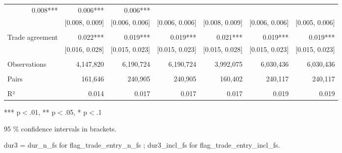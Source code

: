 \begin{table}[!h]
\begin{tabular}{lllllll}
  \multicolumn{1}{r}{0.008***} &
  \multicolumn{1}{r}{0.006***} &
  \multicolumn{1}{r}{0.006***} \\
\multicolumn{1}{l}{} &
  \multicolumn{1}{|r}{[0.008,   0.009]} &
  \multicolumn{1}{r}{[0.006,   0.006]} &
  \multicolumn{1}{r}{[0.006,   0.006]} &
  \multicolumn{1}{r}{[0.008,   0.009]} &
  \multicolumn{1}{r}{[0.006,   0.006]} &
  \multicolumn{1}{r}{[0.005,   0.006]} \\
\multicolumn{1}{l}{} &
  \multicolumn{1}{|r}{} &
  \multicolumn{1}{r}{} &
  \multicolumn{1}{r}{} &
  \multicolumn{1}{r}{} &
  \multicolumn{1}{r}{} &
  \multicolumn{1}{r}{} \\
\multicolumn{1}{l}{Trade agreement} &
  \multicolumn{1}{|r}{0.022***} &
  \multicolumn{1}{r}{0.019***} &
  \multicolumn{1}{r}{0.019***} &
  \multicolumn{1}{r}{0.021***} &
  \multicolumn{1}{r}{0.019***} &
  \multicolumn{1}{r}{0.019***} \\
\multicolumn{1}{l}{} &
  \multicolumn{1}{|r}{[0.016,   0.028]} &
  \multicolumn{1}{r}{[0.015,   0.023]} &
  \multicolumn{1}{r}{[0.015,   0.023]} &
  \multicolumn{1}{r}{[0.015,   0.028]} &
  \multicolumn{1}{r}{[0.015,   0.023]} &
  \multicolumn{1}{r}{[0.015,   0.023]} \\
\multicolumn{1}{l}{} &
  \multicolumn{1}{|r}{} &
  \multicolumn{1}{r}{} &
  \multicolumn{1}{r}{} &
  \multicolumn{1}{r}{} &
  \multicolumn{1}{r}{} &
  \multicolumn{1}{r}{} \\
\multicolumn{1}{l}{Observations} &
  \multicolumn{1}{|r}{4,147,820} &
  \multicolumn{1}{r}{6,190,724} &
  \multicolumn{1}{r}{6,190,724} &
  \multicolumn{1}{r}{3,992,075} &
  \multicolumn{1}{r}{6,030,436} &
  \multicolumn{1}{r}{6,030,436} \\
\multicolumn{1}{l}{} &
  \multicolumn{1}{|r}{} &
  \multicolumn{1}{r}{} &
  \multicolumn{1}{r}{} &
  \multicolumn{1}{r}{} &
  \multicolumn{1}{r}{} &
  \multicolumn{1}{r}{} \\
\multicolumn{1}{l}{Pairs} &
  \multicolumn{1}{|r}{161,646} &
  \multicolumn{1}{r}{240,905} &
  \multicolumn{1}{r}{240,905} &
  \multicolumn{1}{r}{160,402} &
  \multicolumn{1}{r}{240,117} &
  \multicolumn{1}{r}{240,117} \\
\multicolumn{1}{l}{} &
  \multicolumn{1}{|r}{} &
  \multicolumn{1}{r}{} &
  \multicolumn{1}{r}{} &
  \multicolumn{1}{r}{} &
  \multicolumn{1}{r}{} &
  \multicolumn{1}{r}{} \\
\multicolumn{1}{l}{R²} &
  \multicolumn{1}{|r}{0.014} &
  \multicolumn{1}{r}{0.017} &
  \multicolumn{1}{r}{0.017} &
  \multicolumn{1}{r}{0.017} &
  \multicolumn{1}{r}{0.019} &
  \multicolumn{1}{r}{0.019} \\
\cline{1-7}
\end{tabular}

\footnotesize{
*** p$<$.01, ** p$<$.05, * p$<$.1

95 \% confidence intervals in brackets.

dur3 = dur\_n\_fs for flag\_trade\_entry\_n\_fs ; dur3\_incl\_fs for flag\_trade\_entry\_incl\_fs.
}
\end{table}

